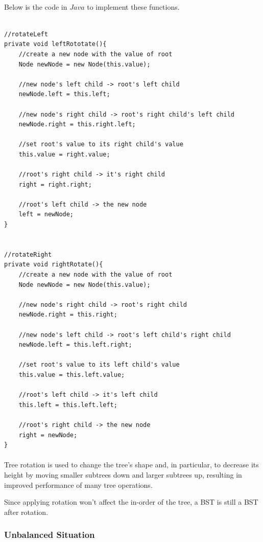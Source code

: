\documentclass{article}
\begin{document}
\paragraph{}
Below is the code in $Java$ to implement these functions.

\begin{verbatim}

//rotateLeft
private void leftRototate(){
    //create a new node with the value of root
    Node newNode = new Node(this.value);

    //new node's left child -> root's left child
    newNode.left = this.left;

    //new node's right child -> root's right child's left child
    newNode.right = this.right.left;

    //set root's value to its right child's value
    this.value = right.value;

    //root's right child -> it's right child
    right = right.right;

    //root's left child -> the new node
    left = newNode;
}


//rotateRight
private void rightRotate(){
    //create a new node with the value of root
    Node newNode = new Node(this.value);

    //new node's right child -> root's right child
    newNode.right = this.right;

    //new node's left child -> root's left child's right child
    newNode.left = this.left.right;

    //set root's value to its left child's value
    this.value = this.left.value;

    //root's left child -> it's left child
    this.left = this.left.left;

    //root's right child -> the new node
    right = newNode;
}

\end{verbatim}

\paragraph{}
Tree rotation is used to change the tree's shape and, in particular, to decrease its height by moving smaller subtrees down and larger subtrees up, resulting in improved performance of many tree operations.

Since applying rotation won't affect the in-order of the tree, a BST is still a BST after rotation.

\subsubsection{Unbalanced Situation}\label{unbalanced_situation}
\end{document}
